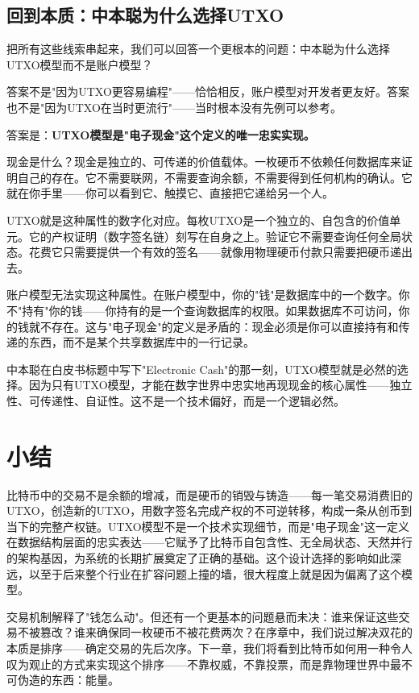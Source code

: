 \documentclass[a4paper,12pt,openany]{ctexbook}
\begin{document}
\subsection*{回到本质：中本聪为什么选择UTXO}


把所有这些线索串起来，我们可以回答一个更根本的问题：中本聪为什么选择UTXO模型而不是账户模型？

答案不是"因为UTXO更容易编程"——恰恰相反，账户模型对开发者更友好。答案也不是"因为UTXO在当时更流行"——当时根本没有先例可以参考。

答案是：\textbf{UTXO模型是"电子现金"这个定义的唯一忠实实现。}

现金是什么？现金是独立的、可传递的价值载体。一枚硬币不依赖任何数据库来证明自己的存在。它不需要联网，不需要查询余额，不需要得到任何机构的确认。它就在你手里——你可以看到它、触摸它、直接把它递给另一个人。

UTXO就是这种属性的数字化对应。每枚UTXO是一个独立的、自包含的价值单元。它的产权证明（数字签名链）刻写在自身之上。验证它不需要查询任何全局状态。花费它只需要提供一个有效的签名——就像用物理硬币付款只需要把硬币递出去。

账户模型无法实现这种属性。在账户模型中，你的"钱"是数据库中的一个数字。你不"持有"你的钱——你持有的是一个查询数据库的权限。如果数据库不可访问，你的钱就不存在。这与"电子现金"的定义是矛盾的：现金必须是你可以直接持有和传递的东西，而不是某个共享数据库中的一行记录。

中本聪在白皮书标题中写下"Electronic Cash"的那一刻，UTXO模型就是必然的选择。因为只有UTXO模型，才能在数字世界中忠实地再现现金的核心属性——独立性、可传递性、自证性。这不是一个技术偏好，而是一个逻辑必然。


\section*{小结}


比特币中的交易不是余额的增减，而是硬币的销毁与铸造——每一笔交易消费旧的UTXO，创造新的UTXO，用数字签名完成产权的不可逆转移，构成一条从创币到当下的完整产权链。UTXO模型不是一个技术实现细节，而是"电子现金"这一定义在数据结构层面的忠实表达——它赋予了比特币自包含性、无全局状态、天然并行的架构基因，为系统的长期扩展奠定了正确的基础。这个设计选择的影响如此深远，以至于后来整个行业在扩容问题上撞的墙，很大程度上就是因为偏离了这个模型。

交易机制解释了"钱怎么动"。但还有一个更基本的问题悬而未决：谁来保证这些交易不被篡改？谁来确保同一枚硬币不被花费两次？在序章中，我们说过解决双花的本质是排序——确定交易的先后次序。下一章，我们将看到比特币如何用一种令人叹为观止的方式来实现这个排序——不靠权威，不靠投票，而是靠物理世界中最不可伪造的东西：能量。
\end{document}
